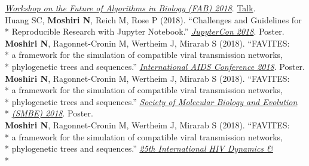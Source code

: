 \documentclass[margin,line]{res}
\begin{document}
\begin{resume}
\hspace*{8mm} \href{http://fab2018.cbd.cmu.edu/}{\textit{Workshop on the Future of Algorithms in Biology (FAB) 2018}}. \href{https://youtu.be/ENKBbV_30kk}{Talk}.\\
\hspace*{4mm} Huang SC, \textbf{Moshiri N}, Reich M, Rose P (2018). ``Challenges and Guidelines for\\*\vspace{2mm}
\hspace*{8mm} Reproducible Research with Jupyter Notebook.'' \href{https://conferences.oreilly.com/jupyter/jup-ny}{\textit{JupyterCon 2018}}. Poster.\\
\hspace*{4mm} \textbf{Moshiri N}, Ragonnet-Cronin M, Wertheim J, Mirarab S (2018). ``FAVITES:\\*
\hspace*{9.5mm} a framework for the simulation of compatible viral transmission networks,\\*\vspace{2mm}
\hspace*{8mm} phylogenetic trees and sequences.'' \href{https://www.aids2018.org/}{\textit{International AIDS Conference 2018}}. Poster.\\
\hspace*{4mm} \textbf{Moshiri N}, Ragonnet-Cronin M, Wertheim J, Mirarab S (2018). ``FAVITES:\\*
\hspace*{9.5mm} a framework for the simulation of compatible viral transmission networks,\\*
\hspace*{9.5mm} phylogenetic trees and sequences.'' \href{https://smbe.org/smbe/SMBE2018Meeting/}{\textit{Society of Molecular Biology and Evolution}}\\*\vspace{2mm}
\hspace*{8mm} \href{https://smbe.org/smbe/SMBE2018Meeting/}{\textit{(SMBE) 2018}}. Poster.\\
\hspace*{4mm} \textbf{Moshiri N}, Ragonnet-Cronin M, Wertheim J, Mirarab S (2018). ``FAVITES:\\*
\hspace*{9.5mm} a framework for the simulation of compatible viral transmission networks,\\*
\hspace*{9.5mm} phylogenetic trees and sequences.'' \href{https://cme.ucsd.edu/hivdynamics/}{\textit{25th International HIV Dynamics \&}}\\*\vspace{2mm}

\end{resume}
\end{document}
